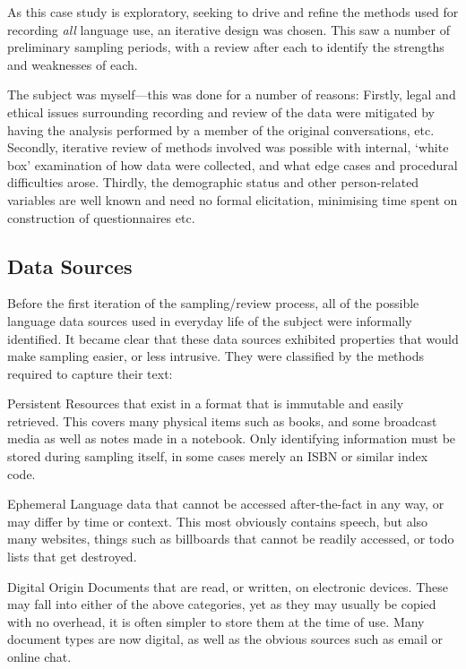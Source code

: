 As this case study is exploratory, seeking to drive and refine the methods used for recording \textsl{all} language use, an iterative design was chosen.  This saw a number of preliminary sampling periods, with a review after each to identify the strengths and weaknesses of each.

The subject was myself---this was done for a number of reasons:  Firstly, legal and ethical issues surrounding recording and review of the data were mitigated by having the analysis performed by a member of the original conversations, etc.
Secondly, iterative review of methods involved was possible with internal, `white box' examination of how data were collected, and what edge cases and procedural difficulties arose.
Thirdly, the demographic status and other person-related variables are well known and need no formal elicitation, minimising time spent on construction of questionnaires etc.


\subsection{Data Sources}
Before the first iteration of the sampling/review process, all of the possible language data sources used in everyday life of the subject were informally identified.  It became clear that these data sources exhibited properties that would make sampling easier, or less intrusive.  They were classified by the methods required to capture their text:

\begin{itemizeTitle}
    \item[Persistent] Resources that exist in a format that is immutable and easily retrieved.  This covers many physical items such as books, and some broadcast media as well as notes made in a notebook.  Only identifying information must be stored during sampling itself, in some cases merely an ISBN or similar index code.
    \item[Ephemeral] Language data that cannot be accessed after-the-fact in any way, or may differ by time or context.  This most obviously contains speech, but also many websites, things such as billboards that cannot be readily accessed, or todo lists that get destroyed.
    \item[Digital Origin] Documents that are read, or written, on electronic devices.  These may fall into either of the above categories, yet as they may usually be copied with no overhead, it is often simpler to store them at the time of use.  Many document types are now digital, as well as the obvious sources such as email or online chat.
\end{itemizeTitle}

